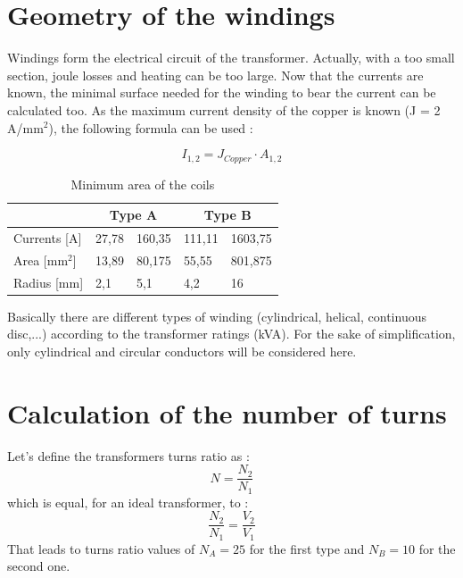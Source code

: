 \documentclass[12pt,a4paper]{report}
\begin{document}

\section{Geometry of the windings}
Windings form the electrical circuit of the transformer. Actually, with a too small section, joule losses and heating can be too large. Now that the currents are known, the minimal surface needed for the winding to bear the current can be calculated too. As the maximum current density of the copper is known (J = 2 A/mm$^2$), the following formula can be used :

 \begin{equation}
    I_{1,2} =  J_{Copper} \cdot A_{1,2}
\end{equation}

\begin{table}[h]
    \centering
\begin{tabular}{|l|l|l|l|l|}
  \hline
    & \multicolumn{2}{c|}{\textbf{Type A}} & \multicolumn{2}{c|}{\textbf{Type B}}\\\hline
    Currents [A] & 27,78 & 160,35 & 111,11 & 1603,75\\\hline
    Area [mm$^2$] & 13,89 & 80,175 & 55,55 & 801,875\\\hline
    Radius [mm] & 2,1 & 5,1 & 4,2 & 16\\\hline
\end{tabular}
    \caption{Minimum area of the coils}
    \label{tab:windings_area}
\end{table}

Basically there are different types of winding (cylindrical, helical, continuous disc,...) according to the transformer ratings (kVA). For the sake of simplification, only cylindrical and circular conductors will be considered here.

\section{Calculation of the number of turns}
Let's define the transformers turns ratio as :
\begin{equation}
     N =  \frac{N_2}{N_1}
\end{equation}
which is equal, for an ideal transformer, to :
\begin{equation}
\frac{N_2}{N_1} = \frac{V_2}{V_1}
\end{equation}
That leads to turns ratio values of $N_A = 25$ for the first type and $N_B = 10$ for the second one.\\
\end{document}
